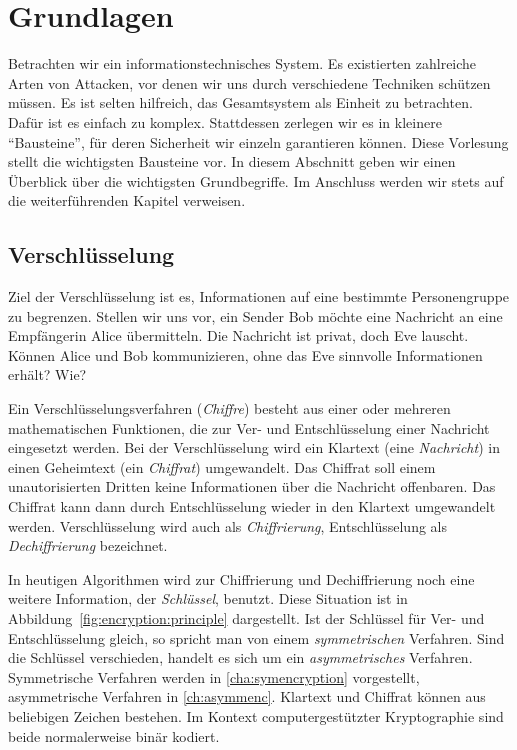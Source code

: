 \section{Grundlagen}
Betrachten wir ein informationstechnisches System. Es existierten zahlreiche Arten von Attacken, vor denen wir uns durch verschiedene Techniken schützen müssen. Es ist selten hilfreich, das Gesamtsystem als Einheit zu betrachten. Dafür ist es einfach zu komplex. Stattdessen zerlegen wir es in kleinere "`Bausteine"', für deren Sicherheit wir einzeln garantieren können. Diese Vorlesung stellt die wichtigsten Bausteine vor. In diesem Abschnitt geben wir einen Überblick über die wichtigsten Grundbegriffe. Im Anschluss werden wir stets auf die weiterführenden Kapitel verweisen.

\subsection{Verschlüsselung}

Ziel der Verschlüsselung ist es, Informationen auf eine bestimmte Personengruppe zu begrenzen. Stellen wir uns vor, ein Sender Bob möchte eine Nachricht an eine Empfängerin Alice übermitteln. Die Nachricht ist privat, doch Eve lauscht. Können Alice und Bob kommunizieren, ohne das Eve sinnvolle Informationen erhält? Wie?

Ein Verschlüsselungsverfahren (\emph{Chiffre}) besteht aus einer oder mehreren mathematischen Funktionen, die zur Ver- und Entschlüsselung einer Nachricht eingesetzt werden. Bei der Verschlüsselung wird ein Klartext (eine \emph{Nachricht}) in einen Geheimtext (ein \emph{Chiffrat}) umgewandelt. Das Chiffrat soll einem unautorisierten Dritten keine Informationen über die Nachricht offenbaren. Das Chiffrat kann dann durch Entschlüsselung wieder in den Klartext umgewandelt werden. Verschlüsselung wird auch als \emph{Chiffrierung}, Entschlüsselung als \emph{Dechiffrierung} bezeichnet.

In heutigen Algorithmen wird zur Chiffrierung und Dechiffrierung noch eine weitere Information, der \emph{Schlüssel}, benutzt. Diese Situation ist in Abbildung~\ref{fig:encryption:principle} dargestellt. Ist der Schlüssel für Ver- und Entschlüsselung gleich, so spricht man von einem \emph{symmetrischen} Verfahren. Sind die Schlüssel verschieden, handelt es sich um ein \emph{asymmetrisches} Verfahren. Symmetrische Verfahren werden in \autoref{cha:symencryption} vorgestellt, asymmetrische Verfahren in \autoref{ch:asymmenc}. Klartext und Chiffrat können aus beliebigen Zeichen bestehen. Im Kontext computergestützter Kryptographie sind beide normalerweise binär kodiert.

